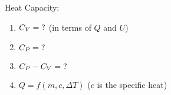 

\vspace*{\fill}
\centering

Heat Capacity:
\begin{enumerate}
    \item $\displaystyle C_{V} = {\rm ?}$ (in terms of $Q$ and $U$)
    \item $\displaystyle C_{P} = {\rm ?}$
    \item $\displaystyle C_{P} - C_{V} = {\rm ?}$
    \item $Q = f(m,c,\Delta T)$ ($c$ is the specific heat)
\end{enumerate}

\centering
\vspace*{\fill}


